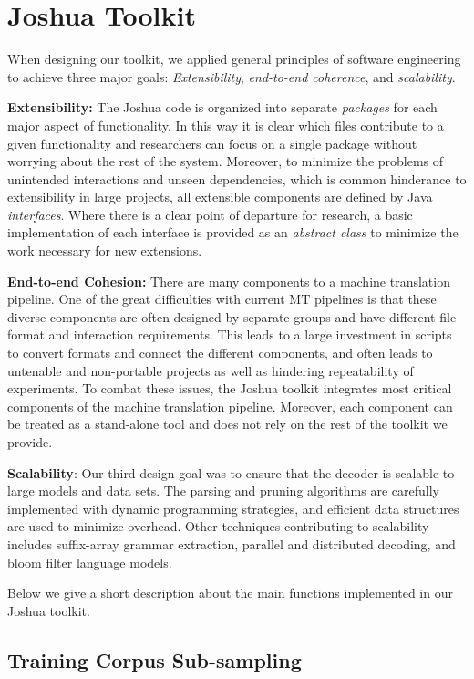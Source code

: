 \documentclass[11pt]{article}
\begin{document}
\section{Joshua Toolkit}
When designing our toolkit,  we applied general principles of software engineering to achieve three major goals: \emph{Extensibility}, \emph{end-to-end coherence}, and \emph{scalability}.

\textbf{Extensibility:} The Joshua code is organized into separate \emph{packages} for each major aspect of functionality. In this way it is clear which files contribute to a given functionality and researchers can focus on a single package without worrying about the rest of the system. Moreover, to minimize the problems of unintended interactions and unseen dependencies, which is common hinderance to extensibility in large projects, all extensible components are defined by Java \emph{interfaces}. Where there is a clear point of departure for research, a basic implementation of each interface is provided as an \emph{abstract class} to minimize the work necessary for new extensions.

\textbf{End-to-end Cohesion:} There are many components to a machine translation pipeline. One of the great difficulties with current MT pipelines is that these diverse components are often designed by separate groups and have different file format and interaction requirements. This leads to a large investment in scripts to convert formats and connect the different components, and often leads to untenable and non-portable projects as well as hindering repeatability of experiments.
To combat these issues, the Joshua toolkit integrates most critical components of the machine translation pipeline. Moreover, each component can be treated as a stand-alone tool and does not rely on the rest of the toolkit we provide.

\textbf{Scalability}: Our third design goal was to ensure that the decoder is scalable to large models and data sets. The parsing and pruning algorithms are carefully implemented with dynamic programming strategies, and efficient data structures are used to minimize overhead. Other techniques contributing to scalability includes suffix-array grammar extraction, parallel and distributed decoding, and bloom filter language models.

Below we give a short description about the main functions implemented in our Joshua toolkit.

\subsection{Training Corpus Sub-sampling}\label{subsampling} 
\end{document}
